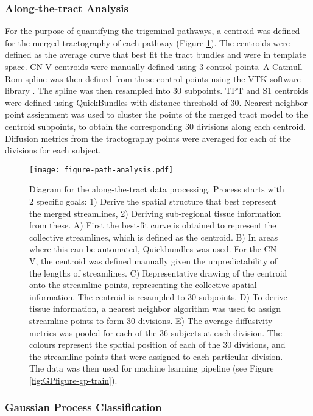 \subsubsection{Along-the-tract Analysis}
For the purpose of quantifying the trigeminal pathways, a centroid was defined for the merged tractography of each pathway (Figure \ref{fig:GPfigure-method-centroid}). The centroids were defined as the average curve that best fit the tract bundles and were in template space. CN V centroids were manually defined using 3 control points. A Catmull-Rom spline \cite{DeRose1988} was then defined from these control points using the VTK software library \cite{Schroeder2005}. The spline was then resampled into 30 subpoints. TPT and S1 centroids were defined using QuickBundles \cite{Garyfallidis2012} with distance threshold of 30. Nearest-neighbor point assignment was used to cluster the points of the merged tract model to the centroid subpoints, to obtain the corresponding 30 divisions along each centroid. Diffusion metrics from the tractography points were averaged for each of the divisions for each subject. 

\begin{figure}[ht]
\centering
\texttt{[image: figure-path-analysis.pdf]}
\caption{Diagram for the along-the-tract data processing.
Process starts with 2 specific goals: 1) Derive the spatial structure that best represent the merged streamlines, 2) Deriving sub-regional tissue information from these. A) First the best-fit curve is obtained to represent the collective streamlines, which is defined as the centroid. B) In areas where this can be automated, Quickbundles was used. For the CN V, the centroid was defined manually given the unpredictability of the lengths of streamlines. C) Representative drawing of the centroid onto the streamline points, representing the collective spatial information. The centroid is resampled to 30 subpoints. D) To derive tissue information, a nearest neighbor algorithm was used to assign streamline points to form 30 divisions. E) The average diffusivity metrics was pooled for each of the 36 subjects at each division. The colours represent the spatial position of each of the 30 divisions, and the streamline points that were assigned to each particular division. The data was then used for machine learning pipeline (see Figure \ref{fig:GPfigure-gp-train}).
}
\label{fig:GPfigure-method-centroid}
\end{figure}

\subsubsection{Gaussian Process Classification}

